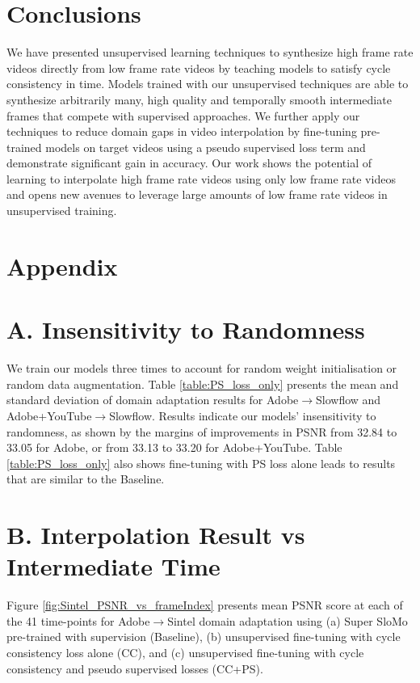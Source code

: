\documentclass[10pt,twocolumn,letterpaper]{article}
\renewcommand{\textrightarrow}{$\rightarrow$}
\begin{document}
 
\section{Conclusions}
We have presented unsupervised learning techniques to synthesize high frame rate videos directly from low frame rate videos by teaching models to satisfy cycle consistency in time. Models trained with our unsupervised techniques are able to synthesize arbitrarily many, high quality and temporally smooth intermediate frames that compete with supervised approaches. We further apply our techniques to reduce domain gaps in video interpolation by fine-tuning pre-trained models on target videos using a pseudo supervised loss term and demonstrate significant gain in accuracy. Our work shows the potential of learning to interpolate high frame rate videos using only low frame rate videos and opens new avenues to leverage large amounts of low frame rate videos in unsupervised training. 

{\small


}



\clearpage
\onecolumn
\section*{Appendix}
\section*{A. Insensitivity to Randomness}
We train our models three times to account for random weight initialisation or random data augmentation. Table \ref{table:PS_loss_only} presents the mean and standard deviation of domain adaptation results for Adobe\textrightarrow Slowflow and Adobe+YouTube\textrightarrow Slowflow. Results indicate our models' insensitivity to randomness, as shown by the margins of improvements in PSNR from 32.84 to 33.05 for Adobe, or from 33.13 to 33.20 for Adobe+YouTube. Table \ref{table:PS_loss_only} also shows fine-tuning with PS loss alone leads to results that are similar to the Baseline.

\section*{B. Interpolation Result vs Intermediate Time}
Figure \ref{fig:Sintel_PSNR_vs_frameIndex} presents mean PSNR score at each of the 41 time-points for Adobe\textrightarrow Sintel domain adaptation using (a) Super SloMo~\cite{jiang2018super} pre-trained with supervision (Baseline), (b) unsupervised fine-tuning with cycle consistency loss alone (CC), and (c) unsupervised fine-tuning with cycle consistency and pseudo supervised losses (CC+PS). 
\end{document}
